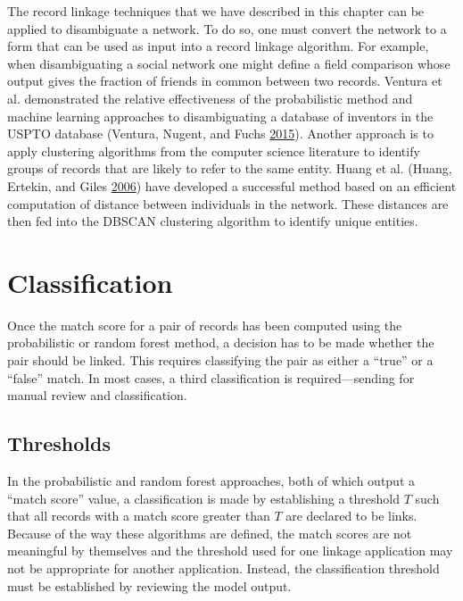 \documentclass[]{krantz}
\begin{document}
The record linkage techniques that we have described in this chapter can
be applied to disambiguate a network. To do so, one must convert the
network to a form that can be used as input into a record linkage
algorithm. For example, when disambiguating a social network one might
define a field comparison whose output gives the fraction of friends in
common between two records. Ventura et al. demonstrated the relative
effectiveness of the probabilistic method and machine learning
approaches to disambiguating a database of inventors in the USPTO
database (Ventura, Nugent, and Fuchs
\protect\hyperlink{ref-ventura2015seeing}{2015}). Another approach is to
apply clustering algorithms from the computer science literature to
identify groups of records that are likely to refer to the same entity.
Huang et al. (Huang, Ertekin, and Giles
\protect\hyperlink{ref-HEG06}{2006}) have developed a successful method
based on an efficient computation of distance between individuals in the
network. These distances are then fed into the DBSCAN clustering
algorithm to identify unique entities.

\vspace*{-3pt}

\section{Classification}\label{classification}

Once the match score for a pair of records has been computed using the
probabilistic or random forest method, a decision has to be made whether
the pair should be linked. This requires classifying the pair as either
a ``true'' or a ``false'' match. In most cases, a third classification
is required---sending for manual review and classification.

\subsection{Thresholds}\label{S:thresholds}

In the probabilistic and random forest approaches, both of which output
a ``match score'' value, a classification is made by establishing a
threshold \(T\) such that all records with a match score greater than
\(T\) are declared to be links. Because of the way these algorithms are
defined, the match scores are not meaningful by themselves and the
threshold used for one linkage application may not be appropriate for
another application. Instead, the classification threshold must be
established by reviewing the model output.
\end{document}
